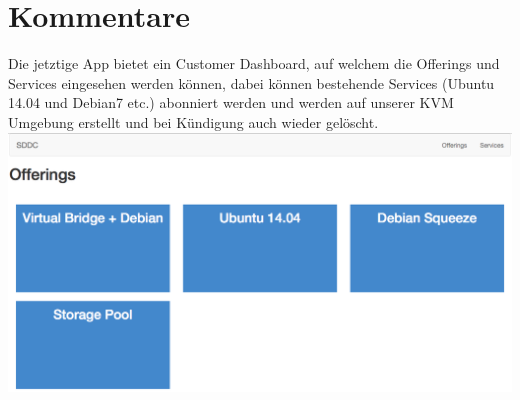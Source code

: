 \section{Kommentare}

Die jetztige App bietet ein Customer Dashboard, auf welchem die Offerings und 
Services eingesehen werden können, dabei können bestehende Services (Ubuntu 14.04 und Debian7 etc.)
abonniert werden und werden auf unserer KVM Umgebung erstellt und bei Kündigung 
auch wieder gelöscht.
\newline
\includegraphics[width=\textwidth]{./10_Protokolle/04_Testprotokoll/images/Sprint2/dashboard}

